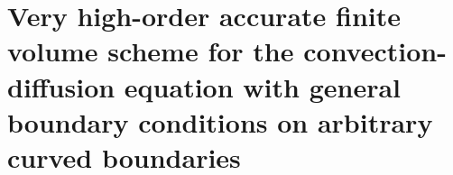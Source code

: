 
\chaptersformat

\chapter{Very high-order accurate finite volume scheme for the convection-diffusion equation with general boundary conditions on arbitrary curved boundaries}

